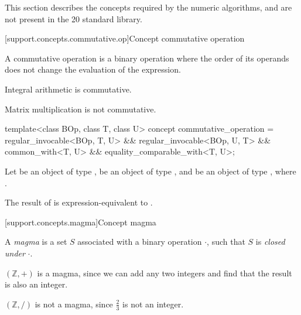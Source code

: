 This section describes the concepts required by the numeric algorithms, and are not present in the
\Cpp{}20 standard library.

[support.concepts.commutative.op]{Concept commutative operation}

\pnum
A commutative operation is a binary operation where the order of its operands does not change the
evaluation of the expression.

\pnum
\begin{example}
   Integral arithmetic is commutative.
\end{example}

\pnum
\begin{example}
   Matrix multiplication is not commutative.
\end{example}

\begin{itemdecl}
  template<class BOp, class T, class U>
  concept commutative_operation =
    regular_invocable<BOp, T, U> &&
    regular_invocable<BOp, U, T> &&
    common_with<T, U> &&
    equality_comparable_with<T, U>;
\end{itemdecl}
\begin{itemdescr}
   \pnum
   Let  be an object of type ,  be an object of type , and
    be an object of type , where .

   \pnum
   The result of  is expression-equivalent to .
\end{itemdescr}

[support.concepts.magma]{Concept magma}

\pnum
A \textit{magma} is a set $S$ associated with a binary operation $\cdot$, such that $S$ is
\textit{closed under} $\cdot$.

\pnum
\begin{example}
   $(\mathbb{Z}, +)$ is a magma, since we can add any two integers and find that the result is also
   an integer.
\end{example}

\pnum
\begin{example}
   $(\mathbb{Z}, /)$ is not a magma, since $\frac{2}{3}$ is not an integer.
\end{example}


